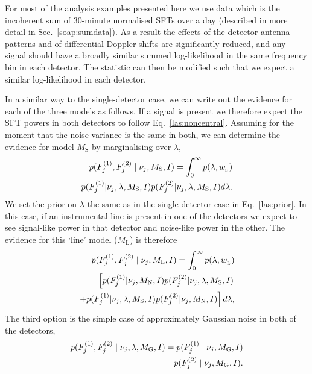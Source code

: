 %
%
For most of the analysis examples presented here we use data which is the incoherent sum of 30-minute normalised \glspl{SFT} over a day (described in more detail in Sec.~\ref{soap:sumdata}). As a result the effects of the detector antenna patterns and of differential Doppler shifts are significantly reduced, and any signal should have a broadly similar summed log-likelihood in the same frequency bin in each detector. The statistic can then be modified such that we expect a similar log-likelihood in each detector.

In a similar way to the single-detector case, we can write out the evidence for each of the three models as follows. If a signal is present we therefore expect the \gls{SFT} powers in both detectors to follow Eq.~\ref{las:noncentral}.  Assuming for the moment that the noise variance is the same in both, we can determine the evidence for model $M_{\text{S}}$ by marginalising over $\lambda$,
%
\begin{equation}
\label{las:signal}
\begin{split}
p(F^{(1)}_{j},F^{(2)}_{j} \mid \nu_j,M_{\rm{S}},I) = \int_0^{\infty}  p(\lambda,w_{\rm_S}) \\
p(F^{(1)}_{j}|\nu_j,\lambda,M_{\text{S}},I)p(F^{(2)}_{j}|\nu_j,\lambda,M_{\text{S}},I) d\lambda.
\end{split}
\end{equation}
%
We set the prior on $\lambda$ the same as in the single detector case in Eq.~\ref{las:prior}.
In this case, if an instrumental line is present in one of the detectors we expect to see signal-like power in that detector and noise-like power in the other.  The evidence for this `line' model ($M_{\text{L}}$) is therefore
%
\begin{equation}
\label{las:line}
\begin{split}
p(F^{(1)}_{j},F^{(2)}_{j} \mid \nu_j,M_{\rm{L}},I) = \int_0^{\infty}  p(\lambda,w_{\rm_L}) \\
\left[ p(F^{(1)}_{j}|\nu_j,M_{\rm{N}},I)p(F^{(2)}_{j}|\nu_j,\lambda,M_{\rm{S}},I) \right. \\
\left. + p(F^{(1)}_{j}|\nu_j,\lambda,M_{\rm{S}},I)p(F^{(2)}_{j}|\nu_j,M_{\rm{N}},I)\right]d\lambda ,
\end{split}
\end{equation}
%
The third option is the simple case of approximately Gaussian noise in both of the detectors,
%
\begin{equation}
\label{las:noise}
\begin{split}
p(F^{(1)}_{j},F^{(2)}_{j} \mid \nu_j,\lambda,M_{\rm{G}},I) = p(F^{(1)}_{j} \mid \nu_j,M_{\rm{G}},I) \\
p(F^{(2)}_{j} \mid \nu_j,M_{\rm{G}},I) .
\end{split}
\end{equation}

